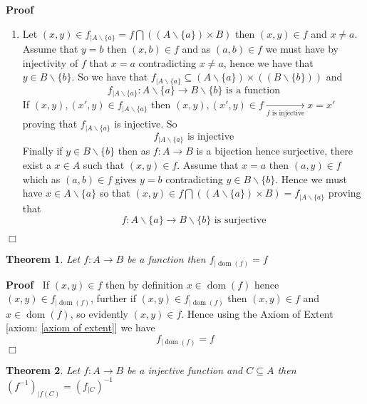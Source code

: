 \documentclass{book}
\newcommand{\Rightarrowlim}{\mathop{\rightarrow}\limits}
\newcommand{\tmop}[1]{\ensuremath{\operatorname{#1}}}
\newcommand{\tmtextbf}[1]{\text{{\bfseries{#1}}}}
\newenvironment{proof}{\noindent\textbf{Proof\ }}{\hspace*{\fill}$\Box$\medskip}
\newtheorem{theorem}{Theorem}
\begin{document}
\begin{proof}
\begin{enumerate}
    \item Let $(x, y) \in f_{|A\backslash \{ a \}} = f \bigcap ((A\backslash
    \{ a \}) \times B)$ then $(x, y) \in f$ and $x \neq a$. Assume that $y =
    b$ then $(x, b) \in f$ and as $(a, b) \in f$ we must have by injectivity
    of $f$ that $x = a$ contradicting $x \neq a$, hence we have that $y \in
    B\backslash \{ b \}$. So we have that $f_{|A\backslash \{ a \}} \subseteq
    (A\backslash \{ a \}) \times ((B\backslash \{ b \}))$ and
    \[ f_{|A\backslash \{ a \}} : A\backslash \{ a \} \rightarrow B\backslash
       \{ b \} \text{ is a function} \]
    If $(x, y), (x', y) \in f_{|A\backslash \{ a \}}$ then $(x, y), (x', y)
    \in f \Rightarrowlim_{f \text{ is injective}} x = x'$ proving that
    $f_{|A\backslash \{ a \}}$ is injective. So
    \[ f_{|A\backslash \{ a \}} \text{ is injective} \]
    Finally if $y \in B\backslash \{ b \}$ then as $f : A \rightarrow B$ is a
    bijection hence surjective, there exist a $x \in A$ such that $(x, y) \in
    f$. Assume that $x = a$ then $(a, y) \in f$ which as $(a, b) \in f$ gives
    $y = b$ contradicting $y \in B\backslash \{ b \}$. Hence we must have $x
    \in A\backslash \{ a \}$ so that $(x, y) \in f \bigcap ((A\backslash \{ a
    \}) \times B) = f_{|A\backslash \{ a \}}$ proving that
    \[ f : A\backslash \{ a \} \rightarrow B\backslash \{ b \} \text{ is
       surjective} \]
  \end{enumerate}
\end{proof}

\begin{theorem}
  \label{function restriction and domain}Let $f : A \rightarrow B$ be a
  \tmtextbf{partial} function then $f_{| \tmop{dom} (f)} = f$
\end{theorem}

\begin{proof}
  If $(x, y) \in f$ then by definition $x \in \tmop{dom} (f)$ hence $(x, y)
  \in f_{| \tmop{dom} (f)}$, further if $(x, y) \in f_{| \tmop{dom} (f)}$ then
  $(x, y) \in f$ and $x \in \tmop{dom} (f)$, so evidently $(x, y) \in f$.
  Hence using the Axiom of Extent [axiom: \ref{axiom of extent}] we have
  \[ f_{| \tmop{dom} (f)} = f \]
\end{proof}

\begin{theorem}
  \label{function inverse and restriction}Let $f : A \rightarrow B$ be a
  injective \tmtextbf{partial} function and $C \subseteq A$ then $(f^{-
  1})_{|f (C)} = (f_{|C})^{- 1}$
\end{theorem}
\end{document}
